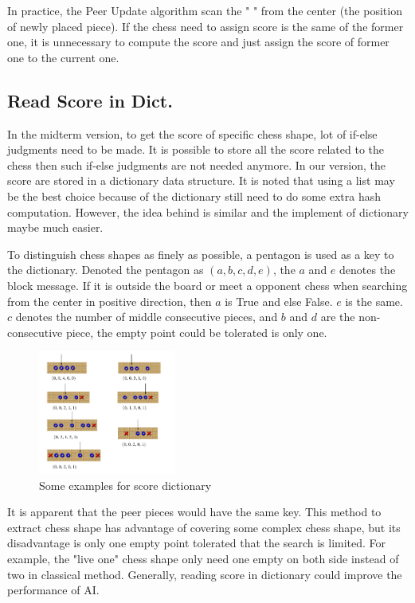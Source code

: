 \documentclass[sigconf, nonacm]{acmart}
\begin{document}
%
In practice, the Peer Update algorithm scan the 
" {\ooalign{$\times$\cr\hidewidth$+$\hidewidth\cr}} "
from the center (the position of newly placed piece).
%
If the chess need to assign score is the same of the former one, it is unnecessary to compute the score and just assign the score of former one to the current one.
%

\subsection{Read Score in Dict.}


%
\quad In the midterm version, to get the score of specific chess shape,  lot of if-else judgments need to be made.
%
It is possible to store all the score related to the chess then such if-else judgments are not needed anymore.
%
In our version, the score are stored in a dictionary data structure.
%
It is noted that using a list may be the best choice because of the dictionary still need to do some extra hash computation.
%
However, the idea behind is similar and the implement of dictionary maybe much easier.
%

%
To distinguish chess shapes as finely as possible, a pentagon is used as a key to the dictionary.
%
Denoted the pentagon as $(a, b, c, d, e)$, the $a$ and $e$ denotes the block message. 
%
If it is outside the board or meet a opponent chess when searching from the center in positive direction, then $a$ is True and else False. 
%
$e$ is the same.
%
$c$ denotes the number of middle consecutive pieces, and $b$ and $d$ are the non-consecutive piece, the empty point could be tolerated is only one.
%


\begin{figure}[h]
  \centering
  \includegraphics[width=0.4\textwidth]{figures/dict.png}
  \caption{Some examples for score dictionary}
  \label{fig:dict}
\end{figure}

%
It is apparent that the peer pieces
would have the same key.
%
This method to extract chess shape has advantage of covering some complex chess shape,
but its disadvantage is only one empty point tolerated that the search is limited.
%
For example, the "live one" chess shape only need one empty on both side instead of two in classical method.
%
Generally, reading score in dictionary could improve the performance of AI.
\end{document}
